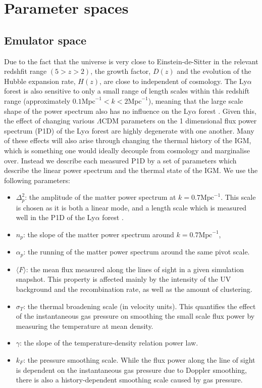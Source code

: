 \documentclass[]{article}
\newcommand{\lyaf}{Ly$\alpha$ forest }                     %
\begin{document}
\section{Parameter spaces}
\subsection{Emulator space}
Due to the fact that the universe is very close to Einstein-de-Sitter in the relevant 
redshfit range $(5>z>2)$, the growth factor, $D(z)$ and the evolution of the Hubble 
expansion rate, $H(z)$, are close to independent of cosmology. The \lyaf is also 
sensitive to only a small range of length scales within this redshift range 
(approximately $0.1 \mathrm{Mpc}^{-1} < k < 2 \mathrm{Mpc}^{-1}$), meaning that the large 
scale shape of the power spectrum also has no influence on the \lyaf. Given this, the 
effect of changing various $\Lambda$CDM parameters on the 1 dimensional flux power 
spectrum (P1D) of the \lyaf are highly degenerate with one another. Many of these effects 
will also arise through changing the thermal history of the IGM, which is something one 
would ideally decouple from cosmology and marginalise over. Instead we describe each 
measured P1D by a set of parameters which describe the linear power spectrum and the 
thermal state of the IGM. We use the following parameters:

\begin{itemize}
    \item $\Delta^2_p$: the amplitude of the matter power spectrum at $k=0.7 \mathrm{Mpc}^
    {-1}$. This scale is chosen as it is both a linear mode, and a length scale which is 
    measured well in the P1D of the \lyaf.
    \item $n_p$: the slope of the matter power spectrum around $k=0.7 \mathrm{Mpc}^{-1}$,
    \item $\alpha_p$: the running of the matter power spectrum around the same pivot 
    scale.
    \item $\langle F\rangle$: the mean flux measured along the lines of sight in
     a given simulation snapshot. 
    This property is affected mainly by the intensity of the UV background and the 
    recombination rate, as well as the amount of clustering.
    \item $\sigma_T$: the thermal broadening scale (in velocity units). This quantifies 
    the effect of the instantaneous gas pressure on smoothing the small scale flux power 
    by measuring the temperature at mean density.
    \item $\gamma$: the slope of the temperature-density relation power law.
    \item $k_F$: the pressure smoothing scale. While the flux power along the line of 
    sight is dependent on the instantaneous gas pressure due to Doppler smoothing, there 
    is also a history-dependent smoothing scale caused by gas pressure\cite{Hui1997}\cite{Gnedin1998}.
\end{itemize}
\end{document}
